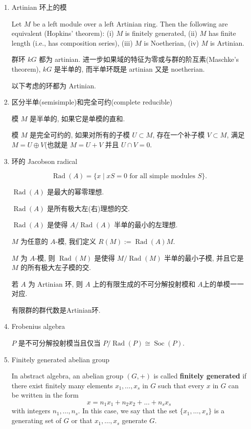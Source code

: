 \documentclass[UTF8]{ctexart}
\DeclareMathOperator{\Soc}{Soc}
\DeclareMathOperator{\Rad}{Rad}
\begin{document}
\begin{enumerate}
\item Artinian 环上的模

Let $M$ be a left module over a left Artinian ring. Then the following are equivalent (Hopkins' theorem): (i) $M$ is finitely generated, (ii) $M$ has finite length (i.e., has composition series), (iii) $M$ is Noetherian, (iv) $M$ is Artinian.

群环 $kG$ 都为 artinian. 进一步如果域的特征为零或与群的阶互素(Maschke's theorem), $kG$ 是半单的, 而半单环既是 artinian 又是 noetherian.

以下考虑的环都为 Artinian.

\item 区分半单(semisimple)和完全可约(complete reducible)

模 $M$ 是半单的, 如果它是单模的直和.

模 $M$ 是完全可约的, 如果对所有的子模 $U\subset M$, 存在一个补子模 $V\subset M$, 满足 $M = U\oplus V$(也就是 $M=U+V$ 并且 $U\cap V = 0$.

\item 环的 Jacobson radical

\[
\Rad(A) = \{ x\mid xS = 0 \text{ for all simple modules } S \}.
\]

$\Rad(A)$ 是最大的幂零理想.

$\Rad(A)$ 是所有极大左(右)理想的交.

$\Rad(A)$ 是使得 $A/\Rad(A)$ 半单的最小的左理想.

$M$ 为任意的 $A$-模, 我们定义 $R(M) := \Rad(A)M$.

$M$ 为 $A$-模, 则 $\Rad(M)$ 是使得 $M/\Rad(M)$ 半单的最小子模, 并且它是 $M$ 的所有极大左子模的交.

若 $A$ 为 Artinian 环, 则 $A$ 上的有限生成的不可分解投射模和 $A$上的单模一一对应.

有限群的群代数是Artinian环.
\item Frobenius algebra

$P$ 是不可分解投射模当且仅当 $P/\Rad(P)\cong \Soc(P)$.

\item Finitely generated abelian group\parencite{finitely_generated_abelian_group}

In abstract algebra, an abelian group $(G, +)$ is called \textbf{finitely generated} if there exist finitely many elements $x_1,\ldots, x_s$ in $G$ such that every $x$ in $G$ can be written in the form
\[
    x = n_1x_1 + n_2x_2 + ... + n_sx_s
\]
with integers $n_1,\ldots, n_s$. In this case, we say that the set $\{x_1,\ldots, x_s\}$ is a generating set of $G$ or that $x_1,\ldots, x_s$ generate $G$.


\end{enumerate}
\end{document}

